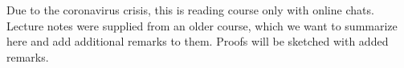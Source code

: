 Due to the coronavirus crisis, this is reading course only with online chats. Lecture notes were supplied from an older course, which we want to summarize here and add additional remarks to them. Proofs will be sketched with added remarks.